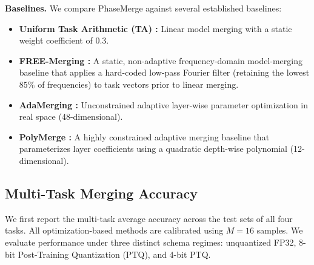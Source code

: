 \textbf{Baselines.} We compare PhaseMerge against several established baselines:
\begin{itemize}
    \item \textbf{Uniform Task Arithmetic (TA) \cite{ilharco2022editing}:} Linear model merging with a static weight coefficient of $0.3$.
    \item \textbf{FREE-Merging \cite{freemerge2024}:} A static, non-adaptive frequency-domain model-merging baseline that applies a hard-coded low-pass Fourier filter (retaining the lowest $85\%$ of frequencies) to task vectors prior to linear merging.
    \item \textbf{AdaMerging \cite{yang2023adamerging}:} Unconstrained adaptive layer-wise parameter optimization in real space (48-dimensional).
    \item \textbf{PolyMerge \cite{polymerge2024}:} A highly constrained adaptive merging baseline that parameterizes layer coefficients using a quadratic depth-wise polynomial (12-dimensional).
\end{itemize}

\subsection{Multi-Task Merging Accuracy}

We first report the multi-task average accuracy across the test sets of all four tasks. All optimization-based methods are calibrated using $M=16$ samples. We evaluate performance under three distinct schema regimes: unquantized FP32, 8-bit Post-Training Quantization (PTQ), and 4-bit PTQ.

